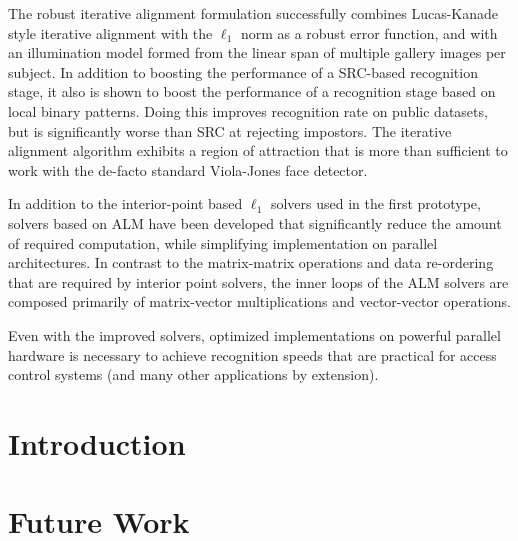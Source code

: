 The robust iterative alignment formulation successfully combines Lucas-Kanade
style iterative alignment with the $\ell_1$ norm as a robust error function,
and with an illumination model formed from the linear span of multiple gallery
images per subject.  In addition to boosting the performance of a SRC-based
recognition stage, it also is shown to boost the performance of a recognition
stage based on local binary patterns.  Doing this improves recognition rate on
public datasets, but is significantly worse than SRC at rejecting impostors.
The iterative alignment algorithm exhibits a region of attraction that is more
than sufficient to work with the de-facto standard Viola-Jones face detector.

In addition to the interior-point based $\ell_1$ solvers used in the first
prototype, solvers based on ALM have been developed that significantly reduce
the amount of required computation, while simplifying implementation on
parallel architectures.  In contrast to the matrix-matrix operations and data
re-ordering that are required by interior point solvers, the inner loops of the
ALM solvers are composed primarily of matrix-vector multiplications and
vector-vector operations.

Even with the improved solvers, optimized implementations on powerful parallel
hardware is necessary to achieve recognition speeds that are practical for
access control systems (and many other applications by extension).

\section{Introduction}

\section{Future Work}



